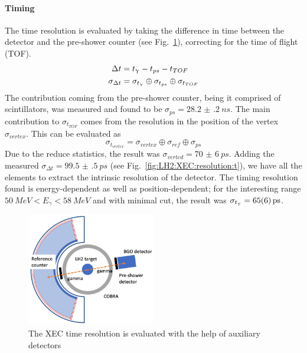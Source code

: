 \begin{refsection}
        \paragraph{Timing}
        The time resolution is evaluated by taking the difference in time between the detector and the pre-shower counter (see Fig.~\ref{fig:CEX:scheme}), correcting for the time of flight (TOF).
        \begin{align}
            \Delta t &= t_\g - t_{ps} - t_{TOF}\\
            \sigma_{\Delta t} &=  \sigma_{t_\g} \oplus \sigma_{t_{ps}} \oplus \sigma_{t_{TOF}}
        \end{align}
        The contribution coming from the pre-shower counter, being it comprised of scintillators, was measured and found to be $\sigma_{ps}=\SI{28.2(2)}{ns}$.
        The main contribution to $\sigma_{t_{TOF}}$ comes from the resolution in the position of the vertex $\sigma_{vertex}$.
        This can be evaluated as 
        $$\sigma_{t_{vertex}} = \sigma_{vertex} \oplus \sigma_{ref} \oplus \sigma_{ps}$$
        Due to the reduce statistics, the result was $\sigma_{verted} = \SI{70(6)}{ps}$.
        Adding the measured $\sigma_{\Delta t} = \SI{99.5(5)}{ps}$ (see Fig.~\ref{fig:LH2:XEC:resolution:t}), we have all the elements to extract the intrinsic resolution of the detector.
        The timing resolution found is energy-dependent as well as position-dependent; for the interesting range $\SI{50}{MeV}<E_\gamma<\SI{58}{MeV}$ and with minimal cut, the result was $\sigma_{t_\g}=\SI{65(6)}{ps}$. 

        \begin{figure}
            \centering
            \includegraphics[width = 0.5\textwidth]{Figures/LH2/2021/CEX_preshower_reference.png}
            \caption{The XEC time resolution is evaluated with the help of auxiliary detectors}
            \label{fig:CEX:scheme}
        \end{figure}


\end{refsection}
